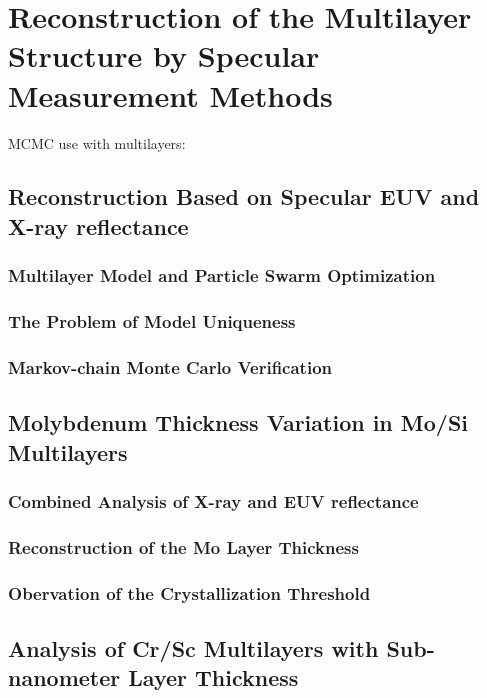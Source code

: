 \chapter{Reconstruction of the Multilayer Structure by Specular Measurement Methods} \label{ch_spec}
\cite{haase_role_2014}
MCMC use with multilayers: \cite{hobson_markov-chain_2004}


\section{Reconstruction Based on Specular EUV and X-ray reflectance}

\subsection{Multilayer Model and Particle Swarm Optimization}

\subsection{The Problem of Model Uniqueness}

\subsection{Markov-chain Monte Carlo Verification}


\section{Molybdenum Thickness Variation in Mo/Si Multilayers}

\subsection{Combined Analysis of X-ray and EUV reflectance}

\subsection{Reconstruction of the Mo Layer Thickness}

\subsection{Obervation of the Crystallization Threshold}


\section{Analysis of Cr/Sc Multilayers with Sub-nanometer Layer Thickness}

